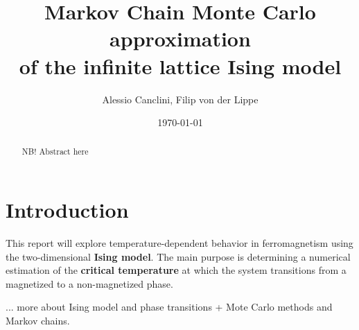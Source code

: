 \documentclass[english,notitlepage,reprint,nofootinbib]{revtex4-1}  %
\begin{document}
\title{Markov Chain Monte Carlo approximation \\of the infinite lattice Ising model}  %
\author{Alessio Canclini, Filip von der Lippe} %
\date{\today}                             %
\noaffiliation                            %

\begin{abstract}
    NB! Abstract here
\end{abstract}
\maketitle


\section{Introduction}
This report will explore temperature-dependent behavior in ferromagnetism using the two-dimensional \textbf{Ising model}. The main purpose is determining a numerical estimation of the \textbf{critical temperature} at which the system transitions from a magnetized to a non-magnetized phase. 

... more about Ising model and phase transitions
+ Mote Carlo methods and Markov chains.

\end{document}
